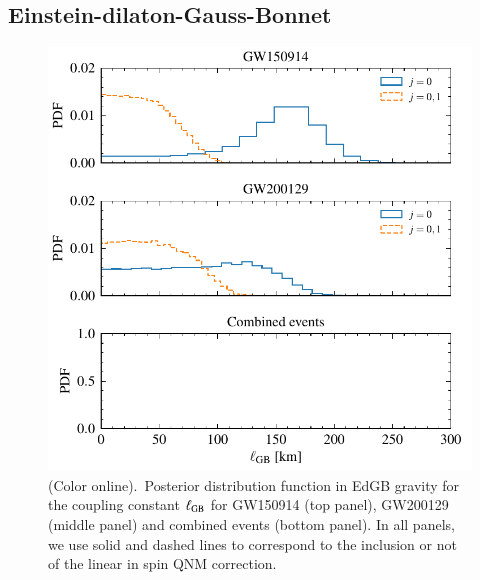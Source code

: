 \documentclass[twocolumn,
               prd,
               aps,
               superscriptaddress,
               tightenlines,
               nofootinbib,
               eqsecnum,
               amsfonts,
               amsmath,
               longbibliography]{revtex4-1}
\newcommand{\hs}[1]{{\textcolor{blue}{{[HS: #1]}} }}
\begin{document}

\subsection{Einstein-dilaton-Gauss-Bonnet}
\label{sec:results_edgb}

\begin{figure}[t]
\includegraphics[width=\columnwidth]{figs/edgb_posteriors_combined.pdf}
\caption{(Color online).~Posterior distribution function in EdGB gravity
for the coupling constant $\ell_{\rm GB}$ for GW150914 (top panel), GW200129 (middle panel)
and combined events (bottom panel).
%
In all panels, we use solid and dashed lines to correspond to the inclusion or not of the linear
in spin QNM correction.}
\label{fig:sGB_exec_sum}
\end{figure}
\end{document}
